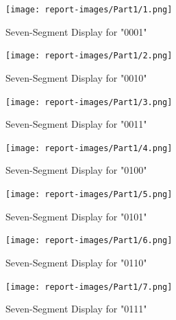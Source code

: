 \documentclass[11pt]{article}
\begin{document}
\begin{figure}[H]
\begin{center}
\texttt{[image: report-images/Part1/1.png]}
\caption{Seven-Segment Display for "0001"}
\label{fig:sevenSegOne}
\end{center}
\end{figure}

\begin{figure}[H]
\begin{center}
\texttt{[image: report-images/Part1/2.png]}
\caption{Seven-Segment Display for "0010"}
\label{fig:sevenSegTwo}
\end{center}
\end{figure}

\begin{figure}[H]
\begin{center}
\texttt{[image: report-images/Part1/3.png]}
\caption{Seven-Segment Display for "0011"}
\label{fig:sevenSegThree}
\end{center}
\end{figure}

\begin{figure}[H]
\begin{center}
\texttt{[image: report-images/Part1/4.png]}
\caption{Seven-Segment Display for "0100"}
\label{fig:sevenSegFour}
\end{center}
\end{figure}

\begin{figure}[H]
\begin{center}
\texttt{[image: report-images/Part1/5.png]}
\caption{Seven-Segment Display for "0101"}
\label{fig:sevenSegFive}
\end{center}
\end{figure}

\begin{figure}[H]
\begin{center}
\texttt{[image: report-images/Part1/6.png]}
\caption{Seven-Segment Display for "0110"}
\label{fig:sevenSegSix}
\end{center}
\end{figure}

\begin{figure}[H]
\begin{center}
\texttt{[image: report-images/Part1/7.png]}
\caption{Seven-Segment Display for "0111"}
\label{fig:sevenSegSeven}
\end{center}
\end{figure}
\end{document}
